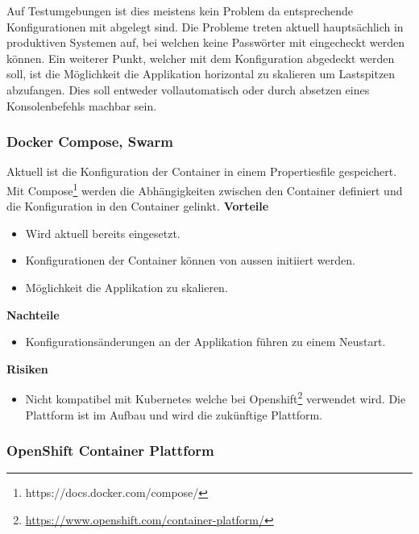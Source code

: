Auf Testumgebungen ist dies meistens kein Problem da entsprechende Konfigurationen mit abgelegt sind. Die Probleme treten aktuell hauptsächlich in produktiven Systemen auf, bei welchen keine Passwörter mit eingecheckt werden können.\newline
Ein weiterer Punkt, welcher mit dem Konfiguration abgedeckt werden soll, ist die Möglichkeit die Applikation horizontal zu skalieren um Lastspitzen abzufangen. Dies soll entweder vollautomatisch oder durch absetzen eines Konsolenbefehls machbar sein.

\subsubsection{Docker Compose, Swarm}

Aktuell ist die Konfiguration der Container in einem Propertiesfile gespeichert. Mit Compose\footnote{https://docs.docker.com/compose/} werden die Abhängigkeiten zwischen den Container definiert und die Konfiguration in den Container gelinkt.\newline
\newline
\textbf{Vorteile}
\begin{itemize}
	\item Wird aktuell bereits eingesetzt.
	\item Konfigurationen der Container können von aussen initiiert werden.
	\item Möglichkeit die Applikation zu skalieren.
\end{itemize}
\textbf{Nachteile}
\begin{itemize}
	\item Konfigurationsänderungen an der Applikation führen zu einem Neustart.
\end{itemize}
\textbf{Risiken}
\begin{itemize}
	\item Nicht kompatibel mit Kubernetes welche bei Openshift\footnote{\url{https://www.openshift.com/container-platform/}}  verwendet wird. Die Plattform ist im Aufbau und wird die zukünftige Plattform.
\end{itemize}

\subsubsection{OpenShift Container Plattform}

